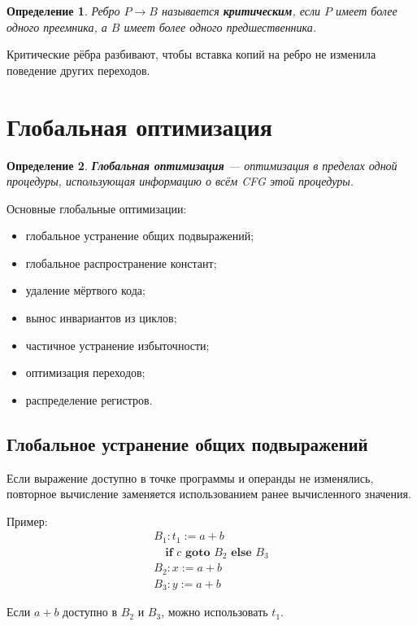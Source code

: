 \documentclass[12pt,a4paper]{article}
\newtheorem{definition}{Определение}
\begin{document}
\begin{definition}
Ребро $P\to B$ называется \textbf{критическим}, если $P$ имеет более одного преемника, а $B$ имеет более одного предшественника.
\end{definition}

Критические рёбра разбивают, чтобы вставка копий на ребро не изменила поведение других переходов.

\section{Глобальная оптимизация}

\begin{definition}
\textbf{Глобальная оптимизация} --- оптимизация в пределах одной процедуры, использующая информацию о всём CFG этой процедуры.
\end{definition}

Основные глобальные оптимизации:
\begin{itemize}
    \item глобальное устранение общих подвыражений;
    \item глобальное распространение констант;
    \item удаление мёртвого кода;
    \item вынос инвариантов из циклов;
    \item частичное устранение избыточности;
    \item оптимизация переходов;
    \item распределение регистров.
\end{itemize}

\subsection{Глобальное устранение общих подвыражений}

Если выражение доступно в точке программы и операнды не изменялись, повторное вычисление заменяется использованием ранее вычисленного значения.

Пример:
\[
\begin{array}{l}
B_1: t_1:=a+b\\
\quad \textbf{if } c \textbf{ goto } B_2 \textbf{ else } B_3\\
B_2: x:=a+b\\
B_3: y:=a+b
\end{array}
\]

Если $a+b$ доступно в $B_2$ и $B_3$, можно использовать $t_1$.
\end{document}
